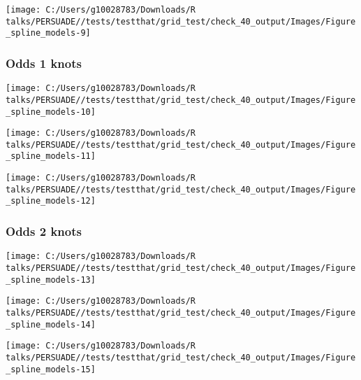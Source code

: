 \documentclass[
]{article}
\begin{document}
\begin{flushleft}\texttt{[image: C:/Users/g10028783/Downloads/R talks/PERSUADE//tests/testthat/grid\_test/check\_40\_output/Images/Figure\_spline\_models-9]} \end{flushleft}

\clearpage

\subsubsection{Odds 1 knots}\label{odds-1-knots}

\begin{flushleft}\texttt{[image: C:/Users/g10028783/Downloads/R talks/PERSUADE//tests/testthat/grid\_test/check\_40\_output/Images/Figure\_spline\_models-10]} \end{flushleft}

\begin{flushleft}\texttt{[image: C:/Users/g10028783/Downloads/R talks/PERSUADE//tests/testthat/grid\_test/check\_40\_output/Images/Figure\_spline\_models-11]} \end{flushleft}

\begin{flushleft}\texttt{[image: C:/Users/g10028783/Downloads/R talks/PERSUADE//tests/testthat/grid\_test/check\_40\_output/Images/Figure\_spline\_models-12]} \end{flushleft}

\clearpage

\subsubsection{Odds 2 knots}\label{odds-2-knots}

\begin{flushleft}\texttt{[image: C:/Users/g10028783/Downloads/R talks/PERSUADE//tests/testthat/grid\_test/check\_40\_output/Images/Figure\_spline\_models-13]} \end{flushleft}

\begin{flushleft}\texttt{[image: C:/Users/g10028783/Downloads/R talks/PERSUADE//tests/testthat/grid\_test/check\_40\_output/Images/Figure\_spline\_models-14]} \end{flushleft}

\begin{flushleft}\texttt{[image: C:/Users/g10028783/Downloads/R talks/PERSUADE//tests/testthat/grid\_test/check\_40\_output/Images/Figure\_spline\_models-15]} \end{flushleft}
\end{document}
